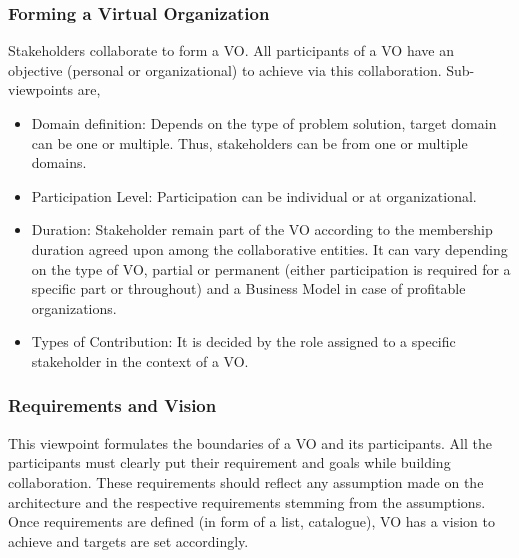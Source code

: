 \documentclass[]{article}
\begin{document}
\subsubsection{Forming a Virtual Organization} Stakeholders collaborate to form a VO. All participants of a VO have an objective (personal or organizational) to achieve via this collaboration. Sub-viewpoints are,
    \begin{itemize}
    \item Domain definition: Depends on the type of problem solution, target domain can be one or multiple. Thus, stakeholders can be from one or multiple domains.
    \item Participation Level: Participation can be individual or at organizational.
    \item Duration: Stakeholder remain part of the VO according to the membership duration agreed upon among the collaborative entities. It can vary depending on the type of VO, partial or permanent (either participation is required for a specific part or throughout) and a Business Model in case of profitable organizations.
    \item Types of Contribution: It is decided by the role assigned to a specific stakeholder in the context of a VO.
    \end{itemize}

\subsubsection{Requirements and Vision} This viewpoint formulates the boundaries of a VO and its participants. All the participants must clearly put their requirement and goals while building collaboration. These requirements should reflect any assumption made on the architecture and the respective requirements stemming from the assumptions. Once requirements are defined (in form of a list, catalogue), VO has a vision to achieve and targets are set accordingly.
\end{document}
